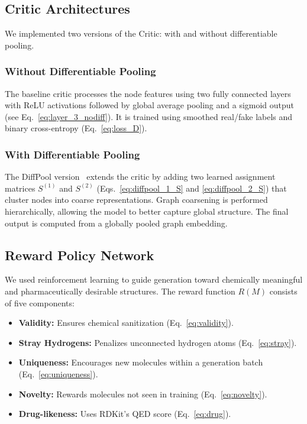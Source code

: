 \documentclass[conference]{IEEEtran}
\begin{document}
\subsection{Critic Architectures}
We implemented two versions of the Critic: with and without differentiable pooling.

\subsubsection{Without Differentiable Pooling}
The baseline critic processes the node features using two fully connected layers with ReLU activations followed by global average pooling 
and a sigmoid output (see Eq.~\eqref{eq:layer_3_nodiff}). It is trained using smoothed real/fake labels and binary cross-entropy (Eq.~\eqref{eq:loss_D}).

\subsubsection{With Differentiable Pooling}
The DiffPool version~\cite{b3} extends the critic by adding two learned assignment matrices $S^{(1)}$ and $S^{(2)}$ (Eqs.~\eqref{eq:diffpool_1_S} 
and \eqref{eq:diffpool_2_S}) that cluster nodes into coarse representations. Graph coarsening is performed hierarchically, allowing the 
model to better capture global structure. The final output is computed from a globally pooled graph embedding.

\subsection{Reward Policy Network}
We used reinforcement learning to guide generation toward chemically meaningful and pharmaceutically desirable structures. The reward function
$R(M)$ consists of five components:

\begin{itemize}
    \item \textbf{Validity:} Ensures chemical sanitization (Eq.~\eqref{eq:validity}).
    \item \textbf{Stray Hydrogens:} Penalizes unconnected hydrogen atoms (Eq.~\eqref{eq:stray}).
    \item \textbf{Uniqueness:} Encourages new molecules within a generation batch (Eq.~\eqref{eq:uniqueness}).
    \item \textbf{Novelty:} Rewards molecules not seen in training (Eq.~\eqref{eq:novelty}).
    \item \textbf{Drug-likeness:} Uses RDKit’s QED score (Eq.~\eqref{eq:drug}).
\end{itemize}
\end{document}
